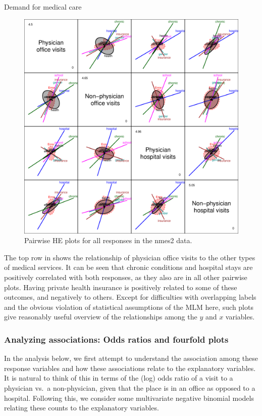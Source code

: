\documentclass[11pt]{book}\usepackage[]{graphicx}\usepackage[]{color}
\newenvironment{knitrout}{}{} %
\renewenvironment{knitrout}{\small\renewcommand{\baselinestretch}{.85}}{} %
\begin{document}
\begin{Example}[nmes4]{Demand for medical care}
\begin{knitrout}
\begin{figure}[!htbp]
\centerline{\includegraphics[width=.9\textwidth]{ch09/fig/nmes4-hepairs} }

\caption[Pairwise HE plots for all responses in the nmes2 data]{Pairwise HE plots for all responses in the nmes2 data.\label{fig:nmes4-hepairs}}
\end{figure}


\end{knitrout}
The top row in  shows the relationship of physician office visits to the other
types of medical services.  It can be seen that chronic conditions and hospital stays are positively
correlated with both responses, as they also are in all other pairwise plots. 
Having private health insurance is positively related to some of these outcomes, and negatively
to others.  Except for difficulties with overlapping labels 
and the obvious violation of statistical assumptions of the MLM here, such plots give 
reasonably useful overview of the relationships among the $y$ and $x$ variables.

\subsubsection{Analyzing associations: Odds ratios and fourfold plots}
In the analysis below, we first attempt to understand the association among these response variables
and how these associations relate to the explanatory variables.  It is natural to think of this in terms
of the (log) odds ratio of a visit to a physician vs.\ a non-physician, given that the place
is in an office as opposed to a hospital.
Following this, we consider some multivariate negative binomial models relating these counts to the
explanatory variables.  


\end{Example}
\end{document}
